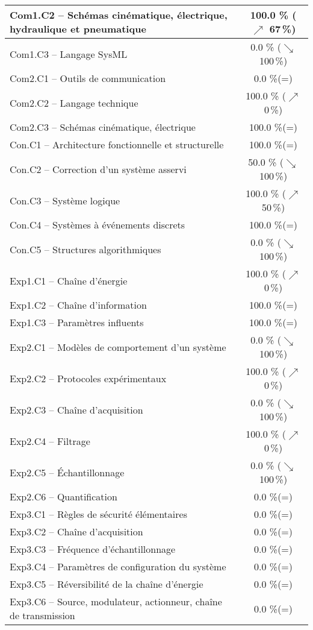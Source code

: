 \begin{center}
\begin{tabular}{|p{.7\linewidth}|c|}
Com1.C2 -- Schémas cinématique, électrique, hydraulique et pneumatique&100.0 \% ($\nearrow$ 67\,\%)\\ \hline 
Com1.C3 -- Langage SysML&0.0 \% ($\searrow$ 100\,\%)\\ \hline 
Com2.C1 -- Outils de communication&0.0 \%(=)\\ \hline 
Com2.C2 -- Langage technique&100.0 \% ($\nearrow$ 0\,\%)\\ \hline 
Com2.C3 -- Schémas cinématique, électrique&100.0 \%(=)\\ \hline 
Con.C1 -- Architecture fonctionnelle et structurelle&100.0 \%(=)\\ \hline 
Con.C2 -- Correction d’un système asservi&50.0 \% ($\searrow$ 100\,\%)\\ \hline 
Con.C3 -- Système logique&100.0 \% ($\nearrow$ 50\,\%)\\ \hline 
Con.C4 -- Systèmes à événements discrets&100.0 \%(=)\\ \hline 
Con.C5 -- Structures algorithmiques&0.0 \% ($\searrow$ 100\,\%)\\ \hline 
Exp1.C1 -- Chaîne d’énergie&100.0 \% ($\nearrow$ 0\,\%)\\ \hline 
Exp1.C2 -- Chaîne d’information&100.0 \%(=)\\ \hline 
Exp1.C3 -- Paramètres influents&100.0 \%(=)\\ \hline 
Exp2.C1 -- Modèles de comportement d’un système&0.0 \% ($\searrow$ 100\,\%)\\ \hline 
Exp2.C2 -- Protocoles expérimentaux&100.0 \% ($\nearrow$ 0\,\%)\\ \hline 
Exp2.C3 -- Chaîne d’acquisition&0.0 \% ($\searrow$ 100\,\%)\\ \hline 
Exp2.C4 -- Filtrage&100.0 \% ($\nearrow$ 0\,\%)\\ \hline 
Exp2.C5 -- Échantillonnage&0.0 \% ($\searrow$ 100\,\%)\\ \hline 
Exp2.C6 -- Quantification&0.0 \%(=)\\ \hline 
Exp3.C1 -- Règles de sécurité élémentaires&0.0 \%(=)\\ \hline 
Exp3.C2 -- Chaîne d'acquisition&0.0 \%(=)\\ \hline 
Exp3.C3 -- Fréquence d’échantillonnage&0.0 \%(=)\\ \hline 
Exp3.C4 -- Paramètres de configuration du système&0.0 \%(=)\\ \hline 
Exp3.C5 -- Réversibilité de la chaîne d’énergie&0.0 \%(=)\\ \hline 
Exp3.C6 -- Source, modulateur, actionneur, chaîne de transmission&0.0 \%(=)\\ \hline 

\end{tabular}
\end{center}
